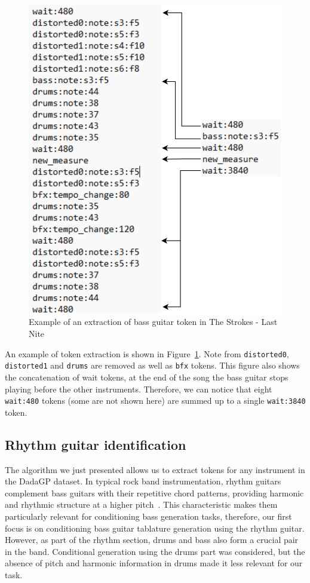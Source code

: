 \begin{figure}[!ht]
    \centering
    \includegraphics[width=.4\linewidth]{../images-figures/token_extraction.png}
    \caption{Example of an extraction of bass guitar token in The Strokes - Last Nite}
    \label{fig:token_extraction}
\end{figure}

An example of token extraction is shown in Figure~\ref{fig:token_extraction}.
Note from \texttt{distorted0}, \texttt{distorted1} and \texttt{drums} are removed as well as \texttt{bfx} tokens.
This figure also shows the concatenation of wait tokens, at the end of the song the bass guitar stops playing before the other instruments.
Therefore, we can notice that eight \texttt{wait:480} tokens (some are not shown here) are summed up to a single \texttt{wait:3840} token.



\subsection{Rhythm guitar identification}

The algorithm we just presented allows us to extract tokens for any instrument in the DadaGP dataset.
In typical rock band instrumentation, rhythm guitars complement bass guitars with their repetitive chord patterns, providing harmonic and rhythmic structure at a higher pitch~\cite{regnier_identification_2021}.
This characteristic makes them particularly relevant for conditioning bass generation tasks, therefore, our first focus is on conditioning bass guitar tablature generation using the rhythm guitar.
However, as part of the rhythm section, drums and bass also form a crucial pair in the band.
Conditional generation using the drums part was considered, but the absence of pitch and harmonic information in drums made it less relevant for our task.


